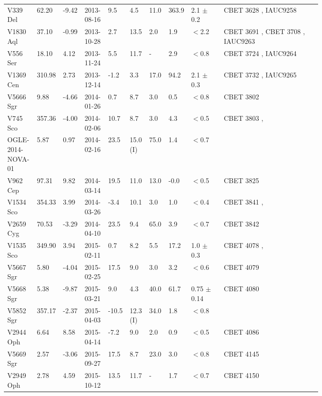 \begin{landscape}
\begin{tiny}
\begin{table*}[!t]
\begin{tabular}{ L{0.07\linewidth} p{0.03\linewidth}  p{0.04\linewidth} p{0.07\linewidth} p{0.03\linewidth} p{0.04\linewidth} p{0.04\linewidth} p{0.03\linewidth} p{0.1\linewidth}  L{0.3\linewidth} }
V339 Del & 62.20 & -9.42 & 2013-08-16 & 9.5 & 4.5 & 11.0 & 363.9 & 2.1 $\pm$ 0.2 & CBET 3628 \citep{CBET3628}, IAUC9258 \citep{IAUC9258}\\
V1830 Aql & 37.10 & -0.99 & 2013-10-28 & 2.7 & 13.5 & 2.0 & 1.9 & $<$2.2 & CBET 3691 \citep{CBET3691}, CBET 3708 \citep{CBET3708}, IAUC9263 \citep{IAUC9263}\\
V556 Ser & 18.10 & 4.12 & 2013-11-24 & 5.5 & 11.7 & - & 2.9 & $<$0.8 & CBET 3724 \citep{CBET3724}, IAUC9264 \citep{IAUC9264}\\
V1369 Cen & 310.98 & 2.73 & 2013-12-14 & -1.2 & 3.3 & 17.0 & 94.2 & 2.1 $\pm$ 0.3 & CBET 3732 \citep{CBET3732}, IAUC9265 \citep{IAUC9265}\\
V5666 Sgr & 9.88 & -4.66 & 2014-01-26 & 0.7 & 8.7 & 3.0 & 0.5 & $<$0.8 & CBET 3802 \citep{CBET3802}\\
V745 Sco & 357.36 & -4.00 & 2014-02-06 & 10.7 & 8.7 & 3.0 & 4.3 & $<$0.5 & CBET 3803 \citep{CBET3803},\citep{ OGLEREF1}\\
OGLE-2014-NOVA-01 & 5.87 & 0.97 & 2014-02-16 & 23.5 & 15.0 (I) & 75.0 & 1.4 & $<$0.7 & \citep{OGLEREF2}\\
V962 Cep & 97.31 & 9.82 & 2014-03-14 & 19.5 & 11.0 & 13.0 & -0.0 & $<$0.5 & CBET 3825 \citep{CBET3825}\\
V1534 Sco & 354.33 & 3.99 & 2014-03-26 & -3.4 & 10.1 & 3.0 & 1.0 & $<$0.4 & CBET 3841 \citep{CBET3841},\citep{2017MNRAS.469.4341M}\\
V2659 Cyg & 70.53 & -3.29 & 2014-04-10 & 23.5 & 9.4 & 65.0 & 3.9 & $<$0.7 & CBET 3842 \citep{CBET3842}\\
V1535 Sco & 349.90 & 3.94 & 2015-02-11 & 0.7 & 8.2 & 5.5 & 17.2 & 1.0 $\pm$ 0.3 & CBET 4078 \citep{CBET4078},\citep{2017MNRAS.469.4341M}\\
V5667 Sgr & 5.80 & -4.04 & 2015-02-25 & 17.5 & 9.0 & 3.0 & 3.2 & $<$0.6 & CBET 4079 \citep{CBET4079}\\
V5668 Sgr & 5.38 & -9.87 & 2015-03-21 & 9.0 & 4.3 & 40.0 & 61.7 & 0.75 $\pm$ 0.14 & CBET 4080 \citep{CBET4080}\\
V5852 Sgr & 357.17 & -2.37 & 2015-04-03 & -10.5 & 12.3 (I) & 34.0 & 1.8 & $<$0.8 & \citep{OGLEREF3}\\
V2944 Oph & 6.64 & 8.58 & 2015-04-14 & -7.2 & 9.0 & 2.0 & 0.9 & $<$0.5 & CBET 4086 \citep{CBET4086}\\
V5669 Sgr & 2.57 & -3.06 & 2015-09-27 & 17.5 & 8.7 & 23.0 & 3.0 & $<$0.8 & CBET 4145 \citep{CBET4145}\\
V2949 Oph & 2.78 & 4.59 & 2015-10-12 & 13.5 & 11.7 & - & 1.7 & $<$0.7 & CBET 4150 \citep{CBET4150}\\

\end{tabular}
\end{table*}
\end{tiny}
\end{landscape}
